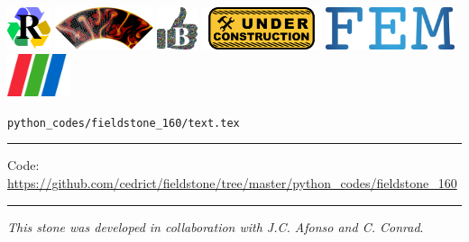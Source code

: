 \noindent
\includegraphics[height=1.25cm]{images/pictograms/replication}
\includegraphics[height=1.25cm]{images/pictograms/aspect_logo}
\includegraphics[height=1.25cm]{images/pictograms/benchmark}
\includegraphics[height=1.25cm]{images/pictograms/under_construction}
\includegraphics[height=1.25cm]{images/pictograms/FEM}
\includegraphics[height=1.25cm]{images/pictograms/paraview}


\begin{flushright} {\tiny {\color{gray} \tt python\_codes/fieldstone\_160/text.tex}} \end{flushright}

%

\par\noindent\rule{\textwidth}{0.4pt}

\begin{center}
\inpython
{\small Code: \url{https://github.com/cedrict/fieldstone/tree/master/python_codes/fieldstone_160}}
\end{center}

\par\noindent\rule{\textwidth}{0.4pt}

{\sl This stone was developed in collaboration with J.C. Afonso and C. Conrad}. 

